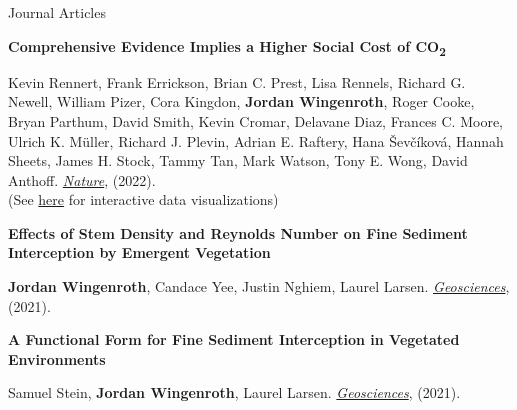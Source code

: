 \documentclass{resume} %
\begin{document}
\begin{rSection}{Journal Articles}

{\bf Comprehensive Evidence Implies a Higher Social Cost of CO\textsubscript{2}}
\vspace{-7pt}
\begin{adjustwidth}{12pt}{}
{\small Kevin Rennert, Frank Errickson, Brian C. Prest, Lisa Rennels, Richard G. Newell, William Pizer, Cora Kingdon, \textbf{Jordan Wingenroth}, Roger Cooke, Bryan Parthum, David Smith, Kevin Cromar, Delavane Diaz, Frances C. Moore, Ulrich K. M\"{u}ller, Richard J. Plevin, Adrian E. Raftery, Hana \v{S}ev\v{c}\'{i}kov\'{a}, Hannah Sheets, James H. Stock, Tammy Tan, Mark Watson, Tony E. Wong, David Anthoff. \textit{\href{https://www.nature.com/articles/s41586-022-05224-9}{Nature}}, (2022).\\
(See \href{https://www.rff.org/publications/data-tools/scc-explorer/}{here} for interactive data visualizations)}
\end{adjustwidth}

{\bf Effects of Stem Density and Reynolds Number on Fine Sediment Interception by Emergent Vegetation}
\vspace{-7pt}
\begin{adjustwidth}{12pt}{}
{\small \textbf{Jordan Wingenroth}, Candace Yee, Justin Nghiem, Laurel Larsen. \textit{\href{https://www.mdpi.com/2076-3263/11/3/136}{Geosciences}}, (2021).}
\end{adjustwidth}

{\bf A Functional Form for Fine Sediment Interception in Vegetated Environments}
\vspace{-7pt}
\begin{adjustwidth}{12pt}{}
{\small Samuel Stein, \textbf{Jordan Wingenroth}, Laurel Larsen. \textit{\href{https://www.mdpi.com/2076-3263/11/4/157}{Geosciences}}, (2021).}
\end{adjustwidth}

\end{rSection}
\end{document}
